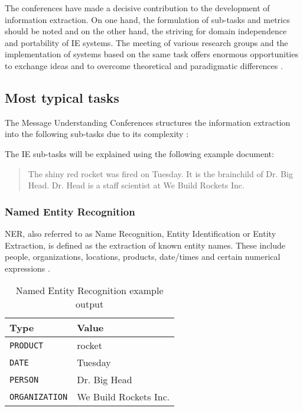 The conferences have made a decisive contribution to the development of information extraction. On one hand, the formulation of sub-tasks and metrics should be noted and on the other hand, the striving for domain independence and portability of \gls{IE} systems. The meeting of various research groups and the implementation of systems based on the same task offers enormous opportunities to exchange ideas and to overcome theoretical and paradigmatic differences \cite{Cimiano:2003}\cite{Lehnert:1994}.

\newpage
\subsection{Most typical tasks}

The Message Understanding Conferences structures the information extraction into the following sub-tasks due to its complexity \cite{Carstensen:2010}\cite{Lavelli:2008}:

The \gls{IE} sub-tasks will be explained using the following example document:

\begin{quote}
The shiny red rocket was fired on Tuesday. It is the brainchild of Dr. Big Head. Dr. Head is a staff scientist at We Build Rockets Inc.
\cite{Cunningham:2005}
\end{quote}

\subsubsection{Named Entity Recognition}
\gls{NER}, also referred to as Name Recognition, Entity Identification or Entity Extraction, is defined as the extraction of known entity names. These include people, organizations, locations, products, date/times and certain numerical expressions \cite{Linsmayr:2010}. 

\begin{table}[H]
\centering
\begin{tabular*}{\textwidth}{ l  l }
	\toprule
	\textbf{Type} & \textbf{Value} \\
	\midrule
	\texttt{PRODUCT} & rocket \\
	\texttt{DATE} & Tuesday \\
	\texttt{PERSON} & Dr. Big Head \\
	\texttt{ORGANIZATION} & We Build Rockets Inc. \\
	\bottomrule
\end{tabular*}
\caption{Named Entity Recognition example output}
\end{table}

